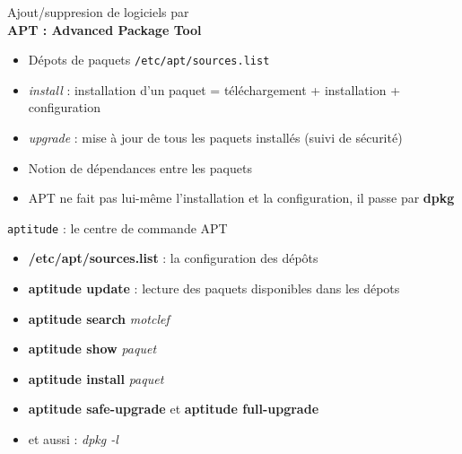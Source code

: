 \documentclass[french]{beamer}
\begin{document}
\begin{frame}
	\begin{center}
	Ajout/suppresion de logiciels par\\
	\textbf{APT : Advanced Package Tool}
	\end{center}
	\begin{itemize}
	\item Dépots de paquets \texttt{/etc/apt/sources.list}
	\item \textit{install} : installation d'un paquet = téléchargement + installation + configuration 
	\item \textit{upgrade} : mise à jour de tous les paquets installés (suivi de sécurité)
	\item Notion de dépendances entre les paquets
	\item APT ne fait pas lui-même l'installation et la configuration, il passe par \textbf{dpkg}
	\end{itemize}
\end{frame}

\begin{frame}
	\begin{center}
	\texttt{aptitude} : le centre de commande APT
	\end{center}
	\begin{itemize}
	\item \textbf{/etc/apt/sources.list} : la configuration des dépôts
	\item \textbf{aptitude update} : lecture des paquets disponibles dans les dépots 
	\item \textbf{aptitude search} \textit{motclef}
	\item \textbf{aptitude show} \textit{paquet}
	\item \textbf{aptitude install} \textit{paquet}
	\item \textbf{aptitude safe-upgrade} et  \textbf{aptitude full-upgrade}
	\item et aussi : \textit{dpkg -l}
	\end{itemize}
\end{frame}
\end{document}
